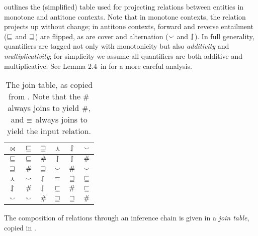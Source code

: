  outlines the (simplified) table used for projecting
  relations between entities in monotone and antitone contexts.
Note that in monotone contexts, the relation projects up without
  change;
  in antitone contexts, forward and reverse entailment
  ($\sqsubseteq$ and $\sqsupseteq$) are flipped, as are cover and
  alternation ($\smallsmile$ and $\downharpoonleft\hspace{-1.25mm}\upharpoonright$).
In full generality, quantifiers are tagged not only with monotonicity
  but also \textit{additivity} and \textit{multiplicativity};
  for simplicity we assume all quantifiers are both additive and
  multiplicative.
See Lemma 2.4\ in  for a more careful
  analysis.

\begin{table}
	\begin{center}
	\begin{tabular}{|c||c|c|c|c|c|}
    \hline
    $\bowtie$ & $\sqsubseteq$ & $\sqsupseteq$ & $\curlywedge$ & $\downharpoonleft\hspace{-1.25mm}\upharpoonright$ & $\smallsmile$ \\
    \hline
    $\sqsubseteq$ & $\sqsubseteq$ & $\#$ & $\downharpoonleft\hspace{-1.25mm}\upharpoonright$ & $\downharpoonleft\hspace{-1.25mm}\upharpoonright$ & $\#$ \\
    $\sqsupseteq$ & $\#$ & $\sqsupseteq$ & $\smallsmile$ & $\#$ & $\smallsmile$ \\
    $\curlywedge$ & $\smallsmile$ & $\downharpoonleft\hspace{-1.25mm}\upharpoonright$ & $\equiv$ & $\sqsupseteq$ & $\sqsubseteq$ \\
    $\downharpoonleft\hspace{-1.25mm}\upharpoonright$ & $\#$ & $\downharpoonleft\hspace{-1.25mm}\upharpoonright$ & $\sqsubseteq$ & $\#$ & $\sqsubseteq$ \\
    $\smallsmile$ & $\smallsmile$ & $\#$ & $\sqsupseteq$ & $\sqsupseteq$ & $\#$ \\
    \hline
	\end{tabular}
	\caption{
    The join table, as copied from .
    Note that the $\#$ always joins to yield $\#$,
    and $\equiv$ always joins to yield the input relation.
		\label{tab:join}
	}
	\end{center}
\end{table}

The composition of relations through an inference chain is given in
  a \textit{join table}, copied in .

